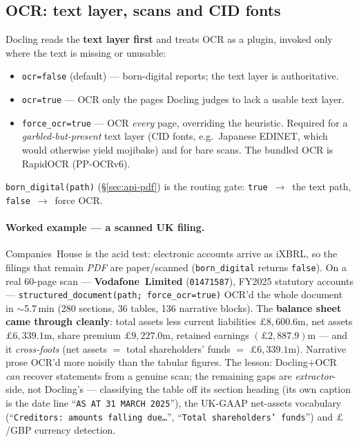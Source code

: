 \documentclass[11pt,a4paper]{report}
\begin{document}
\begin{subappendices}
\subsection{OCR: text layer, scans and CID fonts}
Docling reads the \textbf{text layer first} and treats OCR as a plugin, invoked only where the text is missing
or unusable:
\begin{itemize}[nosep]
  \item \texttt{ocr=false} (default) --- born-digital reports; the text layer is authoritative.
  \item \texttt{ocr=true} --- OCR only the pages Docling judges to lack a usable text layer.
  \item \texttt{force\_ocr=true} --- OCR \emph{every} page, overriding the heuristic. Required for a
    \emph{garbled-but-present} text layer (CID fonts, e.g.\ Japanese EDINET, which would otherwise yield
    mojibake) and for bare scans. The bundled OCR is RapidOCR (PP-OCRv6).
\end{itemize}
\texttt{born\_digital(path)} (\S\ref{sec:api-pdf}) is the routing gate: \texttt{true}~$\to$~the text path,
\texttt{false}~$\to$~force OCR.

\paragraph{Worked example --- a scanned UK filing.} Companies~House is the acid test: electronic accounts
arrive as iXBRL, so the filings that remain \emph{PDF} are paper/scanned (\texttt{born\_digital} returns
\texttt{false}). On a real 60-page scan --- \textbf{Vodafone~Limited} (\texttt{01471587}), FY2025 statutory
accounts --- \texttt{structured\_document(path;\ force\_ocr=true)} OCR'd the whole document in
\(\sim\)5.7\,min (280 sections, 36 tables, 136 narrative blocks). The \textbf{balance sheet came through
cleanly}: total assets less current liabilities \(\pounds8{,}600.6\)m, net assets \(\pounds6{,}339.1\)m, share
premium \(\pounds9{,}227.0\)m, retained earnings \((\pounds2{,}887.9)\)m --- and it \emph{cross-foots} (net
assets \(=\) total shareholders' funds \(=\) \(\pounds6{,}339.1\)m). Narrative prose OCR'd more noisily than
the tabular figures. The lesson: Docling+OCR \emph{can} recover statements from a genuine scan; the remaining
gaps are \emph{extractor}-side, not Docling's --- classifying the table off its section heading (its own
caption is the date line ``\texttt{AS AT 31 MARCH 2025}''), the UK-GAAP net-assets vocabulary
(``\texttt{Creditors: amounts falling due\ldots}'', ``\texttt{Total shareholders' funds}'') and
\(\pounds\)/GBP currency detection.


\end{subappendices}
\end{document}
